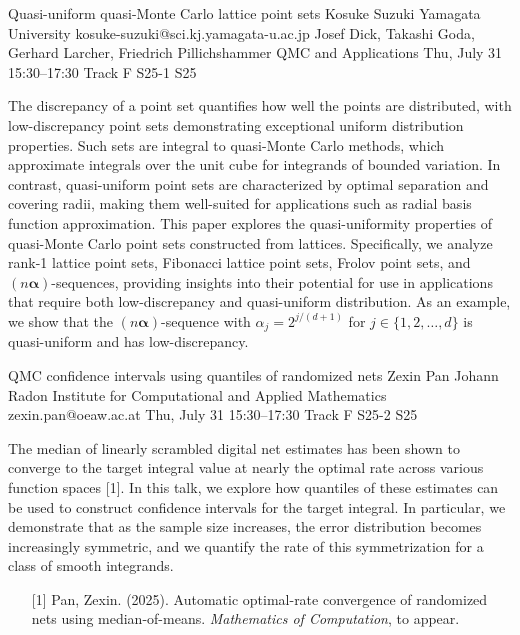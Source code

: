 \begin{talk}
  {Quasi-uniform quasi-Monte Carlo lattice point sets}%
  {Kosuke Suzuki}%
  {Yamagata University}%
  {kosuke-suzuki@sci.kj.yamagata-u.ac.jp}%
  {Josef Dick, Takashi Goda, Gerhard Larcher, Friedrich Pillichshammer}%
  {QMC and Applications}%
  {Thu, July 31 15:30–17:30 Track F}%
  {S25-1}%
  {S25}%
				
			

The discrepancy of a point set quantifies how well the points are distributed, with low-discrepancy point sets demonstrating exceptional uniform distribution properties. Such sets are integral to quasi-Monte Carlo methods, which approximate integrals over the unit cube for integrands of bounded variation. In contrast, quasi-uniform point sets are characterized by optimal separation and covering radii, making them well-suited for applications such as radial basis function approximation. This paper explores the quasi-uniformity properties of quasi-Monte Carlo point sets constructed from lattices. Specifically, we analyze rank-1 lattice point sets, Fibonacci lattice point sets, Frolov point sets, and $(n \boldsymbol{\alpha})$-sequences, providing insights into their potential for use in applications that require both low-discrepancy and quasi-uniform distribution. As an example, we show that the $(n \boldsymbol{\alpha})$-sequence with $\alpha_j = 2^{j/(d+1)}$ for $j \in \{1, 2, \ldots, d\}$ is quasi-uniform and has low-discrepancy.


\end{talk}

\begin{talk}
  {QMC confidence intervals using quantiles of randomized nets}%
  {Zexin Pan}%
  {Johann Radon Institute for Computational and Applied Mathematics}%
  {zexin.pan@oeaw.ac.at}%
  {}%
  {}%
  {Thu, July 31 15:30–17:30 Track F}%
  {S25-2}%
  {S25}%
  {}%
  
				


The median of linearly scrambled digital net estimates has been shown to converge to the target integral value at nearly the optimal rate across various function spaces [1]. In this talk, we explore how quantiles of these estimates can be used to construct confidence intervals for the target integral. In particular, we demonstrate that as the sample size increases, the error distribution becomes increasingly symmetric, and we quantify the rate of this symmetrization for a class of smooth integrands.
            
\medskip


\begin{enumerate}
	\item[{[1]}] Pan, Zexin. (2025). Automatic optimal-rate convergence of randomized nets using median-of-means. {\it  Mathematics of Computation}, to appear.
\end{enumerate}

\end{talk}

